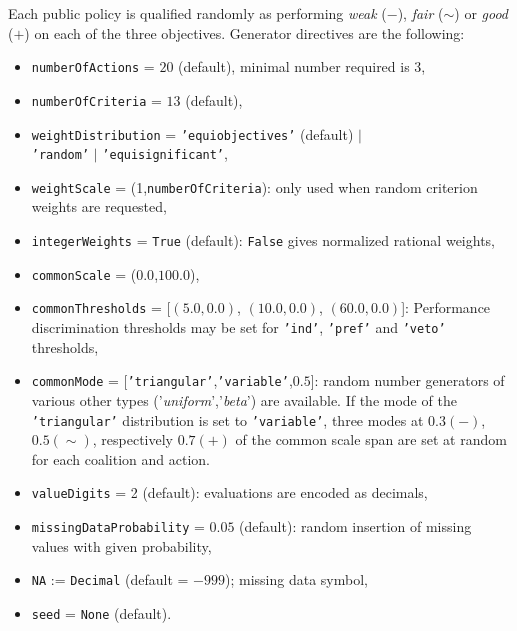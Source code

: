Each public policy is qualified randomly as performing \emph{weak} ($-$), \emph{fair} ($\sim$) or \emph{good} ($+$) on each of the three objectives. 
Generator directives are the following:
\begin{itemize}[leftmargin=0.5cm,rightmargin=0.5cm]
\item \texttt{numberOfActions} = $20$ (default), minimal number required is 3, 
\item \texttt{numberOfCriteria} = $13$ (default),
\item \texttt{weightDistribution} = \texttt{'equiobjectives'} (default) $|$ \\ \texttt{'random'} $|$ \texttt{'equisignificant'},
\item \texttt{weightScale} = (1,\texttt{numberOfCriteria}): only used when random criterion weights are requested,
\item \texttt{integerWeights} = \texttt{True} (default): \texttt{False} gives normalized rational weights, 
\item \texttt{commonScale} = ($0.0$,$100.0$),
\item \texttt{commonThresholds} = [$(5.0,0.0)$, $(10.0,0.0)$, $(60.0,0.0)$]: Performance discrimination thresholds may be set for \texttt{'ind'}, \texttt{'pref'} and \texttt{'veto'} thresholds,  
\item \texttt{commonMode} = [\texttt{'triangular'},\texttt{'variable'},$0.5$]: random number generators of various other types ('\emph{uniform}','\emph{beta}') are available. If the mode of the \texttt{'triangular'} distribution is set to \texttt{'variable'}, three modes at $0.3 (-)$, $0.5 (\sim)$, respectively $0.7 (+)$ of the common scale span are set at random for each coalition and action. 
\item \texttt{valueDigits} = 2 (default): evaluations are encoded as decimals,
\item \texttt{missingDataProbability} = $0.05$ (default): random insertion of missing values with given probability,  
\item \texttt{NA} := \texttt{Decimal} (default = $-999$); missing data symbol,
\item \texttt{seed} = \texttt{None} (default). 
\end{itemize}

